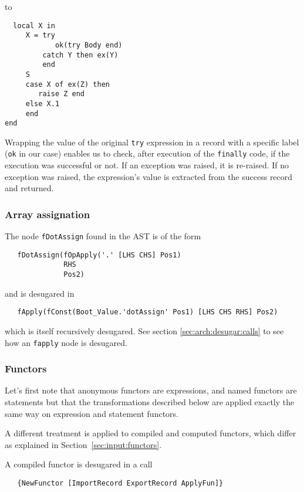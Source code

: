 \documentclass[a4paper]{memoir}
\begin{document}
to

\begin{lstlisting}
  local X in 
     X = try 
            ok(try Body end)
         catch Y then ex(Y)
         end 
     S 
     case X of ex(Z) then 
        raise Z end 
     else X.1 
     end 
end  
\end{lstlisting}

Wrapping the value of the original \lstinline!try! expression in a record
with a specific label (\lstinline!ok! in our case) enables us to check, 
after execution of the \lstinline!finally! code, if the
execution was successful or not. If an exception was raised, it is re-raised. If
no exception was raised, the expression's value is extracted from the success
record and returned.



\subsubsection{Array assignation}\label{sec:arch:desugar:dotassign}
The node \lstinline!fDotAssign! found in the AST is of the form 
\begin{lstlisting}
   fDotAssign(fOpApply('.' [LHS CHS] Pos1) 
              RHS 
              Pos2) 
\end{lstlisting}
and is desugared in 
\begin{lstlisting}
   fApply(fConst(Boot_Value.'dotAssign' Pos1) [LHS CHS RHS] Pos2)
\end{lstlisting}
which is itself recursively desugared. See section \ref{sec:arch:desugar:calls}
to see how an \lstinline!fapply! node is desugared.


\subsubsection{Functors}\label{sec:arch:desugar:functors}
Let's first note that anonymous functors are expressions, and named functors are
statements but that the transformations described below are applied exactly the same way
on expression and statement functors.

A different treatment is applied to compiled and computed functors, which differ
as explained in Section~\ref{sec:input:functors}.

A compiled functor is desugared in a call 
\begin{lstlisting}
   {NewFunctor [ImportRecord ExportRecord ApplyFun]}
\end{lstlisting}
\end{document}
